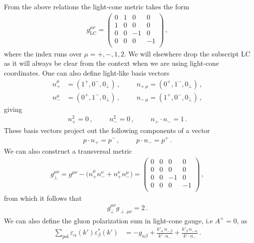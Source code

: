 From the above relations the light-cone metric takes the form
\begin{align}
    g_{\text{LC}}^{\mu\nu}=\begin{pmatrix}
    0 & 1 & 0 & 0\\ 
    1 & 0 & 0 & 0\\
    0 & 0 & -1 & 0\\
    0 & 0 & 0 & -1\\
\end{pmatrix}\,,
\end{align}
where the index runs over $\mu=+,-,1,2$. We will elsewhere drop the subscript $\text{LC}$ as it will always be clear from the context when we are using light-cone coordinates. One can also define light-like basis vectors
\begin{align}
    n_{+}^{\mu}&=(1^{+},0^{-},0_{\perp})\,,\hspace{1cm}n_{+\,\mu}=(0^{+},1^{-},0_{\perp})\,,
    \\
    n_{-}^{\mu}&=(0^{+},1^{-},0_{\perp})\,,\hspace{1cm}n_{-\,\mu}=(1^{+},0^{-},0_{\perp})\,,
\end{align}
giving
\begin{align}
    n_{+}^{2}=0\,,\hspace{1cm}n_{-}^{2}=0\,,\hspace{1cm}n_{+}\cdot n_{-}=1\,.
\end{align}
These basis vectors project out the following components of a vector
\begin{align}
    p\cdot n_{+}=p^{-}\,,\hspace{1cm}p\cdot n_{-}=p^{+}\,.
\end{align}
We can also construct a transversal metric
\begin{align}\label{eq:trasnversal tensor}
    g_{\perp}^{\mu\nu}=g^{\mu\nu}-\big(n_{+}^{\mu}n_{-}^{\nu}+n_{+}^{\nu}n_{-}^{\mu}\big)=\begin{pmatrix}
    0 & 0 & 0 & 0\\ 
    0 & 0 & 0 & 0\\
    0 & 0 & -1 & 0\\
    0 & 0 & 0 & -1\\
\end{pmatrix}\,,
\end{align}
from which it follows that
\begin{align}
    g_{\perp}^{\mu\nu}g_{\perp\,\mu\nu}=2\,.
\end{align}
We can also define the gluon polarization sum in light-cone gauge, i.e $A^{+}=0$, as
\begin{align}\label{eq:gluon polarization sum light-cone gauge}
    \sum_{\text{pol}}\varepsilon_{\alpha}(k')\varepsilon_{\beta}^{*}(k')&=-g_{\alpha\beta}+\frac{k'_{\alpha}\,n_{-\,\beta}}{k'\cdot n_{-}}+\frac{k'_{\beta}\,n_{-\,\alpha}}{k'\cdot n_{-}}\,.
\end{align}








